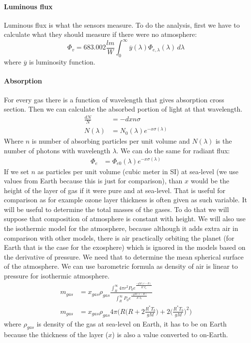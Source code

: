 \documentclass{cfp}
\begin{document}
\paragraph{Luminous flux} Luminous flux is what the sensors measure. To do the analysis, first we have to calculate what they should measure if there were no atmosphere:
\begin{equation}
\Phi_v = 683.002 \frac{lm}{W} \int^{\infty}_0 \overline{y}(\lambda) \Phi_{e,\lambda}(\lambda)\, d \lambda
\end{equation}
where $\overline{y}$ is luminosity function.
\paragraph{Absorption} For every gas there is a function of wavelength that gives absorption cross section. Then we can calculate the absorbed portion of light at that wavelength.
\begin{align}
\frac{dN}{N} &= -dx n \sigma\\
N(\lambda) &= N_0(\lambda) e^{ -x \sigma(\lambda)}
\end{align}
Where $n$ is number of absorbing particles per unit volume and $N(\lambda)$ is the number of photons with wavelength $\lambda$. We can do the same for radiant flux:
\begin{align}
\Phi_{e} &= \Phi_{e0}(\lambda) e^{ -x \sigma(\lambda)}
\end{align}
If we set $n$ as particles per unit volume (cubic meter in SI) at sea-level (we use values from Earth because this is just for comparison), than $x$ would be the height of the layer of gas if it were pure and at sea-level. That is useful for comparison as for example ozone layer thickness is often given as such variable. It will be useful to determine the total masses of the gases. To do that we will suppose that composition of atmosphere is constant with height. We will also use the isothermic model for the atmosphere, because although it adds extra air in comparison with other models, there is air practically orbiting the planet (for Earth that is the case for the exosphere) which is ignored in the models based on the derivative of pressure. We need that to determine the mean spherical surface of the atmosphere. We can use barometric formula as density of air is linear to pressure for isothermic atmosphere.
\begin{align}
m_{gas} &= x_{gas} \rho_{gas} \frac{\int_R^\infty 4 \pi r^2 P_0 e^\frac{-g M (r - R)}{R^* T_b}}{\int_R^\infty P_0 e^\frac{-g M (r - R)}{R^* T_b}}\\
m_{gas} &= x_{gas} \rho_{gas} 4 \pi \Bigg(R \bigg(R + 2\frac{R^*T_b}{gM}\bigg) + 2\bigg(\frac{R^*T_b}{gM}\bigg)^2\Bigg) %
\end{align}
where $\rho_{gas}$ is density of the gas at sea-level on Earth, it has to be on Earth because the thickness of the layer ($x$) is also a value converted to on-Earth.
\end{document}

